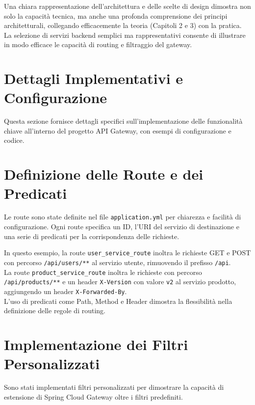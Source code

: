 Una chiara rappresentazione dell'architettura e delle scelte di design dimostra non solo la capacità tecnica, ma anche una profonda comprensione dei principi architetturali, collegando efficacemente la teoria (Capitoli 2 e 3) con la pratica. La selezione di servizi backend semplici ma rappresentativi consente di illustrare in modo efficace le capacità di routing e filtraggio del gateway.

\section{Dettagli Implementativi e Configurazione}

Questa sezione fornisce dettagli specifici sull'implementazione delle funzionalità chiave all'interno del progetto API Gateway, con esempi di configurazione e codice.

\section{Definizione delle Route e dei Predicati}

Le route sono state definite nel file \texttt{application.yml} per chiarezza e facilità di configurazione. Ogni route specifica un ID, l'URI del servizio di destinazione e una serie di predicati per la corrispondenza delle richieste.



In questo esempio, la route \texttt{user\_service\_route} inoltra le richieste GET e POST con percorso \texttt{/api/users/**} al servizio utente, rimuovendo il prefisso \texttt{/api}. \\
La route \texttt{product\_service\_route} inoltra le richieste con percorso \texttt{/api/products/**} e un header \texttt{X-Version} con valore \texttt{v2} al servizio prodotto, aggiungendo un header \texttt{X-Forwarded-By}. \\
 L'uso di predicati come Path, Method e Header dimostra la flessibilità nella definizione delle regole di routing.

\section{Implementazione dei Filtri Personalizzati}
Sono stati implementati filtri personalizzati per dimostrare la capacità di estensione di Spring Cloud Gateway oltre i filtri predefiniti.

